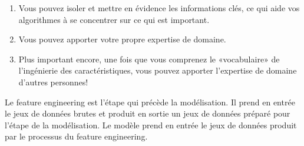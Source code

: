 \documentclass[12pt, french]{report}
\begin{document}
\begin{enumerate}
\item Vous pouvez isoler et mettre en évidence les informations clés, ce qui aide vos algorithmes à se concentrer sur ce qui est important.
\item Vous pouvez apporter votre propre expertise de domaine.
\item Plus important encore, une fois que vous comprenez le «vocabulaire» de l'ingénierie des caractéristiques, vous pouvez apporter l'expertise de domaine d'autres personnes!
\end{enumerate}

Le feature engineering est l'étape qui précède la modélisation. Il prend en entrée le jeux de données brutes et produit en sortie un jeux de données préparé pour l'étape de la modélisation. Le modèle prend en entrée le jeux de données produit par le processus du feature engineering. \\ 
\end{document}
